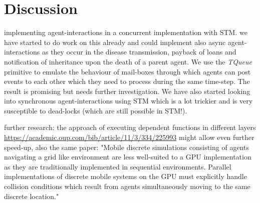 \section{Discussion}
implementing agent-interactions in a concurrent implementation with STM. we have started to do work on this already and could implement also async agent-interactions as they occur in the disease transmission, payback of loans and notification of inheritance upon the death of a parent agent. We use the \textit{TQueue} primitive to emulate the behaviour of mail-boxes through which agents can post events to each other which they need to process during the same time-step. The result is promising but needs further investigation. We have also started looking into synchronous agent-interactions using STM which is a lot trickier and is very susceptible to dead-locks (which are still possible in STM!).

further research: the approach of executing dependent functions in different layers \url{https://academic.oup.com/bib/article/11/3/334/225993} might allow even further speed-up, also the same paper: "Mobile discrete simulations consisting of agents navigating a grid like environment are less well-suited to a GPU implementation as they are traditionally implemented in sequential environments. Parallel implementations of discrete mobile systems on the GPU must explicitly handle collision conditions which result from agents simultaneously moving to the same discrete location."